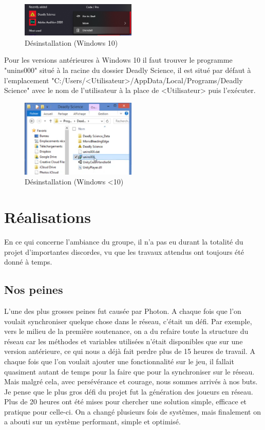 \documentclass{article}
\begin{document}
\begin{figure}[H]
	\centering
	\includegraphics[width=0.49\textwidth]{setup/unins10.png}
	\caption{Désinstallation (Windows 10)}
	\label{setup_3}
\end{figure}

Pour les versions antérieures à Windows 10 il faut trouver le programme "unins000" situé à la racine du dossier Deadly Science, il est situé par défaut à l'emplacement "C:/Users/<Utilisateur>/AppData/Local/Programs/Deadly Science" avec le nom de l'utilisateur à la place de <Utilisateur> puis l'exécuter.

\begin{figure}[H]
	\centering
	\includegraphics[width=0.49\textwidth]{setup/unins.png}
	\caption{Désinstallation (Windows <10)}
	\label{setup_4}
\end{figure}


\newpage
\section{Réalisations}
En ce qui concerne l'ambiance du groupe, il n'a pas eu durant la totalité du projet d'importantes discordes, vu que les travaux attendus ont toujours été donné à temps.

\subsection{Nos peines}
L'une des plus grosses peines fut causée par Photon. A chaque fois que l'on voulait synchroniser quelque chose dans le réseau, c'était un défi. Par exemple, vers le milieu de la première soutenance, on a du refaire toute la structure du réseau car les méthodes et variables utilisées n'était disponibles que sur une version antérieure, ce qui nous a déjà fait perdre plus de 15 heures de travail. A chaque fois que l'on voulait ajouter une fonctionnalité sur le jeu, il fallait quasiment autant de temps pour la faire que pour la synchroniser sur le réseau. Mais malgré cela, avec persévérance et courage, nous sommes arrivés à nos buts. Je pense que le plus gros défi du projet fut la génération des joueurs en réseau. Plus de 20 heures ont été mises pour chercher une solution simple, efficace et pratique pour celle-ci. On a changé plusieurs fois de systèmes, mais finalement on a abouti sur un système performant, simple et optimisé. 
\end{document}
